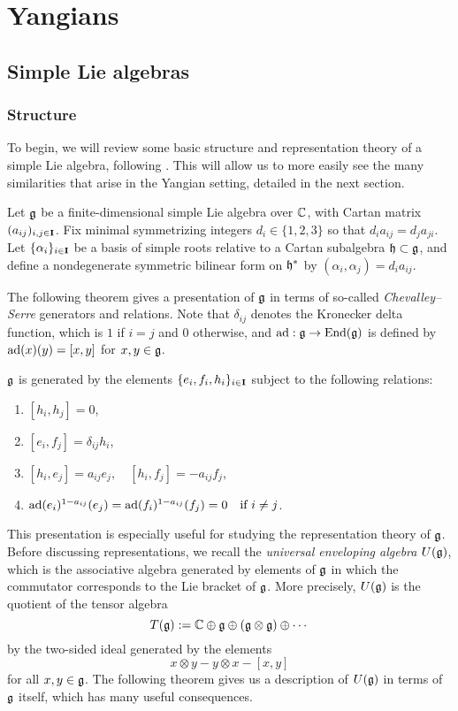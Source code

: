 \chapter{Yangians}

\section{Simple Lie algebras}

\subsection{Structure}

To begin, we will review some basic structure and representation theory of a simple Lie algebra, following \cite{humphreys_introduction_1972}.
This will allow us to more easily see the many similarities that arise in the Yangian setting, detailed in the next section.

Let $\mathfrak{g}$ be a finite-dimensional simple Lie algebra over $\mathbb{C}$, with Cartan matrix $(a_{ij})_{i,j\in\mathbf{I}}$.
Fix minimal symmetrizing integers $d_i\in\{1,2,3\}$ so that $d_ia_{ij}=d_ja_{ji}$.
Let $\{\alpha_i\}_{i\in\mathbf{I}}$ be a basis of simple roots relative to a Cartan subalgebra $\mathfrak{h}\subset\mathfrak{g}$, and define a nondegenerate symmetric bilinear form on $\mathfrak{h}^{*}$ by $(\alpha_i,\alpha_j)=d_ia_{ij}$.

The following theorem gives a presentation of $\mathfrak{g}$ in terms of so-called \emph{Chevalley--Serre} generators and relations.
Note that $\delta_{ij}$ denotes the Kronecker delta function, which is $1$ if $i=j$ and $0$ otherwise, and $\operatorname{ad}:\mathfrak{g}\to\operatorname{End}(\mathfrak{g})$ is defined by $\operatorname{ad}(x)(y)=[x,y]$ for $x,y\in\mathfrak{g}$.

\begin{theorem}[Serre]\label{T:Serre}
    $\mathfrak{g}$ is generated by the elements $\{e_i,f_i,h_i\}_{i\in\mathbf{I}}$ subject to the following relations:
    \begin{enumerate}
        \item $[h_i,h_j] = 0$,
        \item $[e_i,f_j] = \delta_{ij}h_i$,
        \item $[h_i,e_j] = a_{ij}e_j, \quad [h_i,f_j] = -a_{ij}f_j$,
        \item $\operatorname{ad}(e_i)^{1-a_{ij}}(e_j) = \operatorname{ad}(f_i)^{1-a_{ij}}(f_j) = 0 \quad\text{if } i\neq j$.
    \end{enumerate}
\end{theorem}

This presentation is especially useful for studying the representation theory of $\mathfrak{g}$.
Before discussing representations, we recall the \emph{universal enveloping algebra} $U(\mathfrak{g})$, which is the associative algebra generated by elements of $\mathfrak{g}$ in which the commutator corresponds to the Lie bracket of $\mathfrak{g}$.
More precisely, $U(\mathfrak{g})$ is the quotient of the tensor algebra
\[T(\mathfrak{g}) := \mathbb{C} \oplus \mathfrak{g} \oplus (\mathfrak{g}\otimes\mathfrak{g}) \oplus \cdots\]
by the two-sided ideal generated by the elements
\[x\otimes y - y\otimes x - [x,y]\]
for all $x,y\in\mathfrak{g}$.
The following theorem gives us a description of $U(\mathfrak{g})$ in terms of $\mathfrak{g}$ itself, which has many useful consequences.

